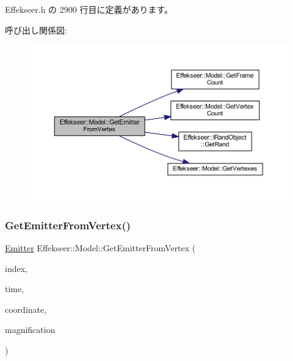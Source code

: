  Effekseer.\+h の 2900 行目に定義があります。

呼び出し関係図\+:\nopagebreak
\begin{figure}[H]
\begin{center}
\leavevmode
\includegraphics[width=350pt]{class_effekseer_1_1_model_a903c0b92208cebf971846956770fb681_cgraph}
\end{center}
\end{figure}
\mbox{\label{class_effekseer_1_1_model_a0cdeb0635f63e2697bb82f74c8c40aef}} 
\subsubsection{\texorpdfstring{Get\+Emitter\+From\+Vertex()}{GetEmitterFromVertex()}\hspace{0.1cm}{\footnotesize\ttfamily [2/2]}}
{\footnotesize\ttfamily \mbox{\hyperlink{struct_effekseer_1_1_model_1_1_emitter}{Emitter}} Effekseer\+::\+Model\+::\+Get\+Emitter\+From\+Vertex (\begin{DoxyParamCaption}\item[{int32\+\_\+t}]{index,  }\item[{int32\+\_\+t}]{time,  }\item[{\mbox{\hyperlink{namespace_effekseer_ac8508f8823c5fcf36aac5d2ddee23765}{Coordinate\+System}}}]{coordinate,  }\item[{float}]{magnification }\end{DoxyParamCaption})\hspace{0.3cm}{\ttfamily [inline]}}



